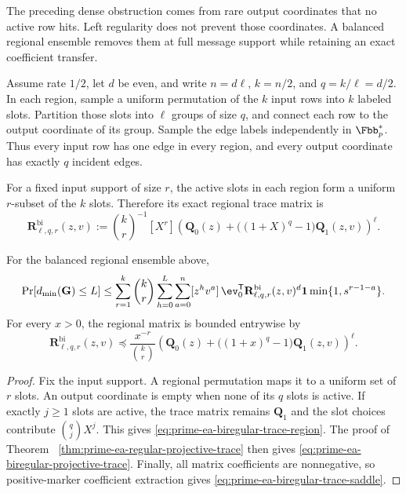 The preceding dense obstruction comes from rare output coordinates that no
active row hits.  Left regularity does not prevent those coordinates.  A
balanced regional ensemble removes them at full message support while
retaining an exact coefficient transfer.

Assume rate $1/2$, let $d$ be even, and write
$n=d\ell$, $k=n/2$, and $q=k/\ell=d/2$.  In each region, sample a uniform
permutation of the $k$ input rows into $k$ labeled slots.  Partition those
slots into $\ell$ groups of size $q$, and connect each row to the output
coordinate of its group.  Sample the edge labels independently in
$\Fbb_p^*$.  Thus every input row has one edge in every region, and every
output coordinate has exactly $q$ incident edges.

For a fixed input support of size $r$, the active slots in each region form a
uniform $r$-subset of the $k$ slots.  Therefore its exact regional trace
matrix is
\begin{equation}
 \mathbf R^{\mathrm{bi}}_{\ell,q,r}(z,v)
 :=\binom{k}{r}^{-1}[X^r]
 \left(
  \mathbf Q_0(z)+\bigl((1+X)^q-1\bigr)\mathbf Q_1(z,v)
 \right)^\ell.
 \label{eq:prime-ea-biregular-trace-region}
\end{equation}

\begin{theorem}
\label{thm:prime-ea-biregular-projective-trace}
For the balanced regional ensemble above,
\begin{equation}
 \Pr[d_{\min}(\G)\leq L]
 \leq
 \sum_{r=1}^k\binom{k}{r}
 \sum_{h=0}^L\sum_{a=0}^n[z^hv^a]\,
 \ev_0^{\mathsf T}
 \mathbf R^{\mathrm{bi}}_{\ell,q,r}(z,v)^d\boldsymbol 1
 \min\{1,s^{r-1-a}\}.
 \label{eq:prime-ea-biregular-projective-trace}
\end{equation}
For every $x>0$, the regional matrix is bounded entrywise by
\begin{equation}
 \mathbf R^{\mathrm{bi}}_{\ell,q,r}(z,v)
 \preceq
 \frac{x^{-r}}{\binom{k}{r}}
 \left(
  \mathbf Q_0(z)+\bigl((1+x)^q-1\bigr)\mathbf Q_1(z,v)
 \right)^\ell.
 \label{eq:prime-ea-biregular-trace-saddle}
\end{equation}
\end{theorem}

\begin{proof}
Fix the input support.  A regional permutation maps it to a uniform set of
$r$ slots.  An output coordinate is empty when none of its $q$ slots is
active.  If exactly $j\geq1$ slots are active, the trace matrix remains
$\mathbf Q_1$ and the slot choices contribute $\binom qjX^j$.  This gives
\eqref{eq:prime-ea-biregular-trace-region}.  The proof of Theorem~
\ref{thm:prime-ea-regular-projective-trace} then gives
\eqref{eq:prime-ea-biregular-projective-trace}.  Finally, all matrix
coefficients are nonnegative, so positive-marker coefficient extraction gives
\eqref{eq:prime-ea-biregular-trace-saddle}.
\end{proof}

